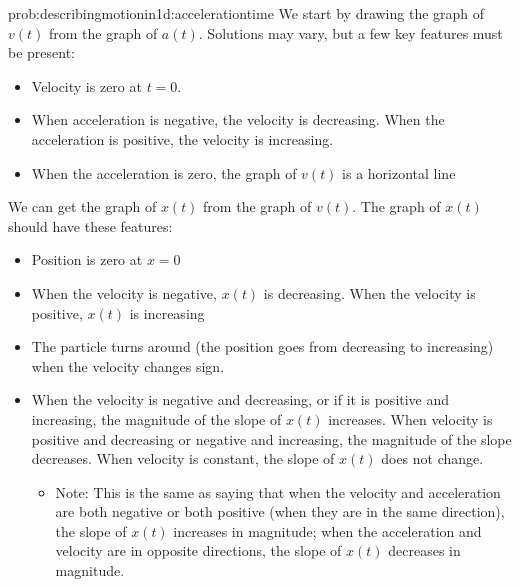 \newpage
\begin{solution}{prob:describingmotionin1d:accelerationtime}\label{soln:describingmotionin1d:accelerationtime}
We start by drawing the graph of $v(t)$ from the graph of $a(t)$. Solutions may vary, but a few key features must be present:
\begin{itemize}
\item Velocity is zero at $t=0$.
\item When acceleration is negative, the velocity is decreasing. When the acceleration is positive, the velocity is increasing. 
\item When the acceleration is zero, the graph of $v(t)$ is a horizontal line
\end{itemize}
We can get the graph of $x(t)$ from the graph of $v(t)$. The graph of $x(t)$ should have these features:
\begin{itemize}
\item Position is zero at $x=0$
\item When the velocity is negative, $x(t)$ is decreasing. When the velocity is positive, $x(t)$ is increasing
\item The particle turns around (the position goes from decreasing to increasing) when the velocity changes sign. 
\item When the velocity is negative and decreasing, or if it is positive and increasing, the magnitude of the slope of $x(t)$ increases. When velocity is positive and decreasing or negative and increasing, the magnitude of the slope decreases. When velocity is constant, the slope of $x(t)$ does not change. 
\begin{itemize}
\item Note: This is the same as saying that when the velocity and acceleration are both negative or both positive (when they are in the same direction), the slope of $x(t)$ increases in magnitude; when the acceleration and velocity are in opposite directions, the slope of $x(t)$ decreases in magnitude. 
\end{itemize}
\end{itemize}
\end{solution}


